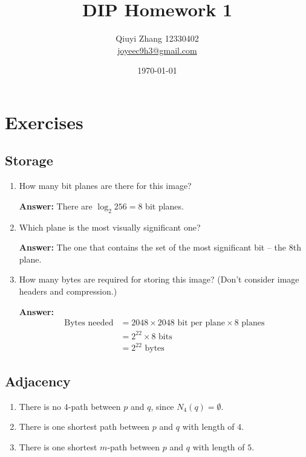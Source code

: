 \documentclass{article}
\begin{document}
\title{DIP Homework 1}
\author{Qiuyi Zhang 12330402 \\ \href{mailto:joyeec9h3@gmail.com}{joyeec9h3@gmail.com}} 
\date{\today}
\maketitle
\tableofcontents
\section{Exercises}

\subsection{Storage}
\begin{enumerate}
\item How many bit planes are there for this image?

\textbf{Answer:} There are $\log_{2} 256 = 8$ bit planes.

\item Which plane is the most visually significant one?

\textbf{Answer:} The one that contains the set of the most significant bit -- the 8th plane.

\item How many bytes are required for storing this image? (Don't consider image headers and compression.)

\textbf{Answer:} 
\begin{align*} 
\textrm{Bytes needed} & = 2048 \times 2048\textrm{ bit per plane} \times 8\textrm{ planes} \\
 & = 2^{22} \times 8\textrm{ bits} \\
 & = 2^{22}\textrm{ bytes}
\end{align*}
\end{enumerate}

\subsection{Adjacency}

\begin{enumerate}
\item There is no $4$-path between $p$ and $q$, since $N_{4}(q) = \emptyset$.
\item There is one shortest path between $p$ and $q$ with length of $4$.
\item There is one shortest $m$-path between $p$ and $q$ with length of $5$.
\end{enumerate}
\end{document}
